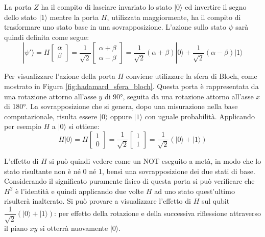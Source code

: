 La porta $Z$ ha il compito di lasciare invariato lo stato $|0\rangle$ ed invertire il segno dello stato $|1\rangle$ mentre la porta $H$, utilizzata maggiormente, ha il compito di trasformare uno stato base in una sovrapposizione.
L'azione sullo stato $\psi$ sarà quindi definita come segue:
\small
\begin{equation}
    |\psi'\rangle = H
    \begin{bmatrix}
        \alpha\\
        \beta
    \end{bmatrix} =
    \dfrac{1}{\sqrt{2}}
    \begin{bmatrix}
        \alpha + \beta\\
        \alpha - \beta
    \end{bmatrix} =
    \dfrac{1}{\sqrt{2}}
    (\alpha + \beta)|0\rangle +
    \dfrac{1}{\sqrt{2}}
    (\alpha - \beta)|1\rangle
\end{equation}
\normalsize

Per visualizzare l'azione della porta $H$ conviene utilizzare la sfera di Bloch, come mostrato in Figura \ref{fig:hadamard_sfera_bloch}.
Questa porta è rappresentata da una rotazione attorno all'asse $y$ di \ang{90}, seguita da una rotazione attorno all'asse $x$ di \ang{180}.
La sovrapposizione che si genera, dopo una misurazione nella base computazionale, risulta essere $|0\rangle$ oppure $|1\rangle$ con uguale probabilità.
Applicando per esempio $H$ a $|0\rangle$ si ottiene:
\begin{equation}
    H|0\rangle = H
    \begin{bmatrix}
        1\\
        0
    \end{bmatrix} =
    \dfrac{1}{\sqrt{2}}
    \begin{bmatrix}
        1\\
        1
    \end{bmatrix} =
    \dfrac{1}{\sqrt{2}}
    (|0\rangle + |1\rangle)
\end{equation}

L'effetto di $H$ si può quindi vedere come un NOT eseguito a metà, in modo che lo stato risultante non è né 0 né 1, bensì una sovrapposizione dei due stati di base.
Considerando il significato puramente fisico di questa porta si può verificare che $H^2$ è l'identità e quindi applicando due volte $H$ ad uno stato quest'ultimo risulterà inalterato.
Si può provare a visualizzare l'effetto di $H$ sul qubit $\dfrac{1}{\sqrt{2}}(|0\rangle + |1\rangle)$: per effetto della rotazione e della successiva riflessione attraverso il piano $xy$ si otterrà nuovamente $|0\rangle$.

